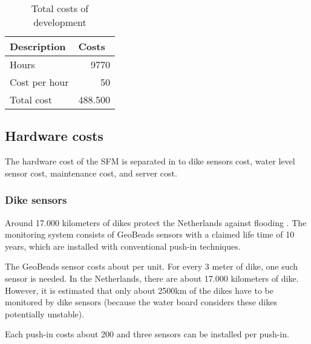 

\begin{table}[H]
	\centering
	\begin{tabular}{lr}
	\toprule
	\textbf{Description} & \multicolumn{1}{l}{\textbf{Costs}} \\ \hline
	Hours & 9770 \\
	Cost per hour & \EUR{}50 \\
	Total cost & \EUR{}488.500 \\
	\bottomrule
	\end{tabular}
	\caption{Total costs of development}
	\label{table:total-dev-costs1}
\end{table}

\subsection{Hardware costs}
The hardware cost of the \gls{SFM} is separated in to dike sensors cost, water level sensor cost, maintenance cost, and server cost.

\subsubsection{Dike sensors}
Around 17.000 kilometers of dikes protect the Netherlands against flooding \cite{DMC}. 
The monitoring system consists of GeoBeads sensors with a claimed life time of 10 years, which are installed with conventional push-in techniques. 

The GeoBeads sensor costs about  per unit. For every 3 meter of dike, one such sensor is needed. In the Netherlands, there are about 17.000 kilometers of dike. However, it is estimated that only about 2500km of the dikes have to be monitored by dike sensors (because the water board considers these dikes potentially unstable).

Each push-in costs about \EUR{}200 and three sensors can be installed per push-in\cite{TUDelftPHD}. %

